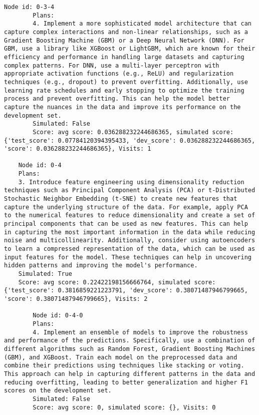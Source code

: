 \begin{lstlisting}[style=txtfile]
		Node id: 0-3-4
		Plans: 
		4. Implement a more sophisticated model architecture that can capture complex interactions and non-linear relationships, such as a Gradient Boosting Machine (GBM) or a Deep Neural Network (DNN). For GBM, use a library like XGBoost or LightGBM, which are known for their efficiency and performance in handling large datasets and capturing complex patterns. For DNN, use a multi-layer perceptron with appropriate activation functions (e.g., ReLU) and regularization techniques (e.g., dropout) to prevent overfitting. Additionally, use learning rate schedules and early stopping to optimize the training process and prevent overfitting. This can help the model better capture the nuances in the data and improve its performance on the development set.
		Simulated: False
		Score: avg score: 0.036288232244686365, simulated score: {'test_score': 0.07784120394395433, 'dev_score': 0.036288232244686365, 'score': 0.036288232244686365}, Visits: 1

	Node id: 0-4
	Plans: 
	3. Introduce feature engineering using dimensionality reduction techniques such as Principal Component Analysis (PCA) or t-Distributed Stochastic Neighbor Embedding (t-SNE) to create new features that capture the underlying structure of the data. For example, apply PCA to the numerical features to reduce dimensionality and create a set of principal components that can be used as new features. This can help in capturing the most important information in the data while reducing noise and multicollinearity. Additionally, consider using autoencoders to learn a compressed representation of the data, which can be used as input features for the model. These techniques can help in uncovering hidden patterns and improving the model's performance.
	Simulated: True
	Score: avg score: 0.22422198156666764, simulated score: {'test_score': 0.3816859221223791, 'dev_score': 0.38071487946799665, 'score': 0.38071487946799665}, Visits: 2

		Node id: 0-4-0
		Plans: 
		4. Implement an ensemble of models to improve the robustness and performance of the predictions. Specifically, use a combination of different algorithms such as Random Forest, Gradient Boosting Machines (GBM), and XGBoost. Train each model on the preprocessed data and combine their predictions using techniques like stacking or voting. This approach can help in capturing different patterns in the data and reducing overfitting, leading to better generalization and higher F1 scores on the development set.
		Simulated: False
		Score: avg score: 0, simulated score: {}, Visits: 0


\end{lstlisting}
